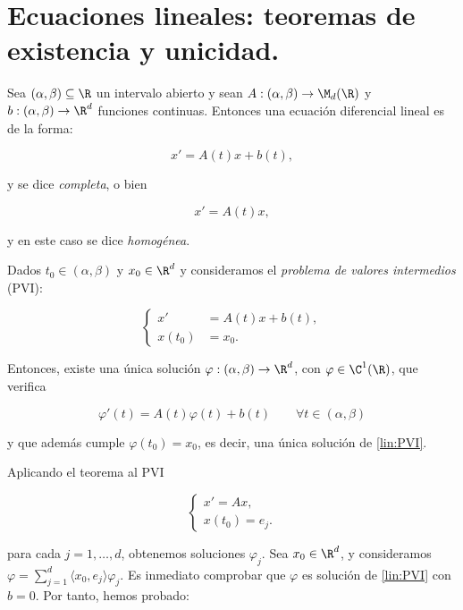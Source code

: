 \section{Ecuaciones lineales: teoremas de existencia y unicidad.}


\begin{ndef}
Sea $(\alpha,\beta)\subseteq \R$ un intervalo abierto y sean $A:(\alpha,\beta)\to \M_d(\R)$ y $b:(\alpha,\beta)\to \R^d$ funciones continuas. Entonces una ecuación diferencial lineal es de la forma:

\begin{equation}
x'=A(t)x+b(t) \tag{C} \label{lin:completa}
,\end{equation}

y se dice \emph{completa}, o bien

\begin{equation}
x'=A(t)x \tag{H} \label{lin:homogenea}
,\end{equation}

y en este caso se dice \emph{homogénea}.
\end{ndef}

\begin{nth}
Dados $t_0\in(\alpha,\beta)$ y $x_0 \in \R^d$ y consideramos el \emph{problema de valores intermedios} (PVI):

\begin{equation}
\left\{\begin{array}{rl}
x' &=A(t)x+b(t), \\
x(t_0)&=x_0.
\end{array}\right.
\tag{PVI}\label{lin:PVI}
\end{equation}

Entonces, existe una única solución $\varphi : (\alpha,\beta)\to\R^d$, con $\varphi \in \C ^ 1(\R)$, que verifica

\[
\varphi'(t) = A(t)\varphi(t) + b(t) \qquad \forall t \in (\alpha,\beta)
\]

y que además cumple $\varphi(t_0)=x_0$, es decir, una única solución de \ref{lin:PVI}.
\end{nth}

Aplicando el teorema al PVI

\[
\begin{cases}
  x' = Ax, \\
  x(t_0) = e_j.
\end{cases}
\tag{PVI$_j$} \label{lin:PVIj}
\]

para cada $j=1,\dots,d$, obtenemos soluciones $\varphi_j$. Sea $x_0\in \R^d$, y consideramos $\varphi = \sum_{j=1}^d \langle x_0,e_j \rangle\varphi_j$.
Es inmediato comprobar que $\varphi$ es solución de \ref{lin:PVI} con $b=0$. Por tanto, hemos probado:


